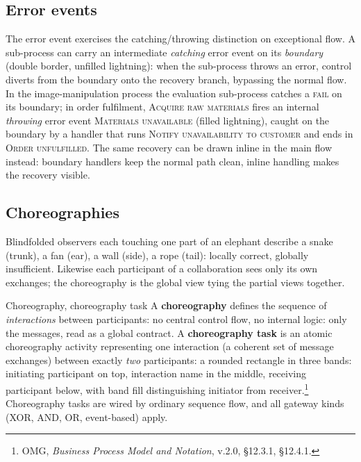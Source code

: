 \subsection{Error events}

The error event exercises the catching/throwing distinction on exceptional flow. A sub-process can carry an intermediate \emph{catching} error event on its \emph{boundary} (double border, unfilled lightning): when the sub-process throws an error, control diverts from the boundary onto the recovery branch, bypassing the normal flow. In the image-manipulation process the evaluation sub-process catches a \textsc{fail} on its boundary; in order fulfilment, \textsc{Acquire raw materials} fires an internal \emph{throwing} error event \textsc{Materials unavailable} (filled lightning), caught on the boundary by a handler that runs \textsc{Notify unavailability to customer} and ends in \textsc{Order unfulfilled}. The same recovery can be drawn inline in the main flow instead: boundary handlers keep the normal path clean, inline handling makes the recovery visible.

\subsection{Choreographies}

Blindfolded observers each touching one part of an elephant describe a snake (trunk), a fan (ear), a wall (side), a rope (tail): locally correct, globally insufficient. Likewise each participant of a collaboration sees only its own exchanges; the choreography is the global view tying the partial views together.

\begin{definitionbox}{Choreography, choreography task}
A \textbf{choreography} defines the sequence of \emph{interactions} between participants: no central control flow, no internal logic: only the messages, read as a global contract. A \textbf{choreography task} is an atomic choreography activity representing one interaction (a coherent set of message exchanges) between exactly \emph{two} participants: a rounded rectangle in three bands: initiating participant on top, interaction name in the middle, receiving participant below, with band fill distinguishing initiator from receiver.\footnote{OMG, \emph{Business Process Model and Notation}, v.2.0, \S12.3.1, \S12.4.1.} Choreography tasks are wired by ordinary sequence flow, and all gateway kinds (XOR, AND, OR, event-based) apply.
\end{definitionbox}

